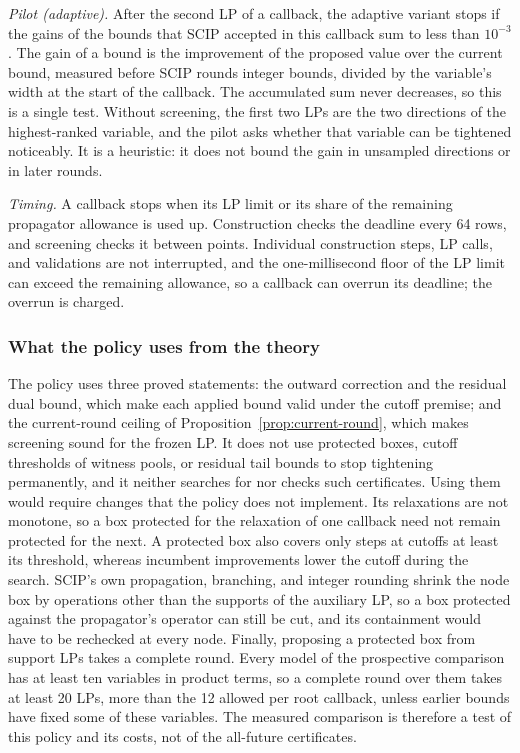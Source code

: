 \emph{Pilot (adaptive).} After the second LP of a callback, the adaptive
variant stops if the gains of the bounds that SCIP accepted in this callback
sum to less than $10^{-3}$. The gain of a bound is the improvement of the
proposed value over the current bound, measured before SCIP rounds integer
bounds, divided by the variable's width at the start of the callback. The
accumulated sum never decreases, so this is a single test. Without screening,
the first two LPs are the two directions of the highest-ranked variable, and
the pilot asks whether that variable can be tightened noticeably. It is a
heuristic: it does not bound the gain in unsampled directions or in later
rounds.

\emph{Timing.} A callback stops when its LP limit or its share of the
remaining propagator allowance is used up. Construction checks the deadline every
64 rows, and screening checks it between points. Individual construction steps,
LP calls, and validations are not interrupted, and the one-millisecond floor
of the LP limit can exceed the remaining allowance, so a callback can overrun
its deadline; the overrun is charged.

\subsubsection{What the policy uses from the theory}

The policy uses three proved statements: the outward correction and the
residual dual bound, which make each applied bound valid under the cutoff
premise; and the current-round ceiling of
Proposition~\ref{prop:current-round}, which makes screening sound for the
frozen LP. It does not use protected boxes, cutoff thresholds of witness
pools, or residual tail bounds to stop tightening permanently, and it neither
searches for nor checks such certificates. Using them would require changes
that the policy does not implement. Its relaxations are not monotone, so a
box protected for the relaxation of one callback need not remain protected
for the next. A protected box also covers only steps at cutoffs at least its
threshold, whereas incumbent improvements lower the cutoff during the
search. SCIP's own propagation, branching,
and integer rounding shrink the node box by operations other than the
supports of the auxiliary LP, so a box protected against the propagator's
operator can still be cut,
and its containment would have to be rechecked at every node. Finally,
proposing a protected box from support LPs takes a complete round. Every
model of the prospective comparison has at least ten variables in product
terms, so a complete round over them takes at least 20 LPs, more than the 12
allowed per root callback, unless earlier bounds have fixed some of these
variables. The measured comparison is
therefore a test of this policy and its costs, not of the all-future
certificates.
